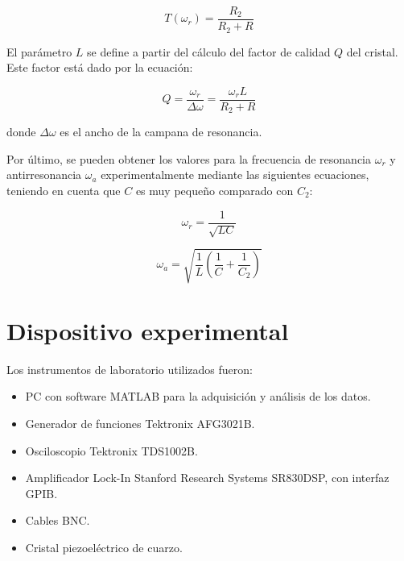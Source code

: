 \documentclass[twoside,twocolumn,a4paper]{article}
\begin{document}
\begin{equation}
\label{eq:transferenciar}
T(\omega_{r}) = \frac{R_{2}}{R_{2} + R}
\end{equation}

\par
El par\'ametro $L$ se define a partir del c\'alculo del factor de calidad  $Q$ del cristal. Este factor est\'a dado por la ecuaci\'on:

\begin{equation}
\label{eq:merito}
Q = \frac{\omega_{r}}{\Delta \omega} = \frac{\omega_{r}L}{R_{2} + R}
\end{equation}

donde $\Delta \omega$ es el ancho de la campana de resonancia. \newline

\par
Por \'ultimo, se pueden obtener los valores para la frecuencia de resonancia $\omega_{r}$ y antirresonancia $\omega_{a}$ experimentalmente mediante las siguientes ecuaciones, teniendo en cuenta que $C$ es muy peque\~no comparado con $C_{2}$:

\begin{equation}
\label{eq:wr}
\omega_{r} = \frac{1}{\sqrt{LC}}
\end{equation}

\begin{equation}
\label{eq:wa}
\omega_{a} = \sqrt{\frac{1}{L}(\frac{1}{C} + \frac{1}{C_{2}})}
\end{equation}


\section{Dispositivo experimental}

Los instrumentos de laboratorio utilizados fueron:
\begin{itemize}
\item 
\label{Laser} PC con software MATLAB para la adquisici\'on y an\'alisis de los datos.
\item Generador de funciones Tektronix AFG3021B.
\item Osciloscopio Tektronix TDS1002B.
\item Amplificador Lock-In Stanford Research Systems SR830DSP, con interfaz GPIB.
\item Cables BNC.
\item Cristal piezoel\'ectrico de cuarzo.
\end{itemize}
\end{document}
